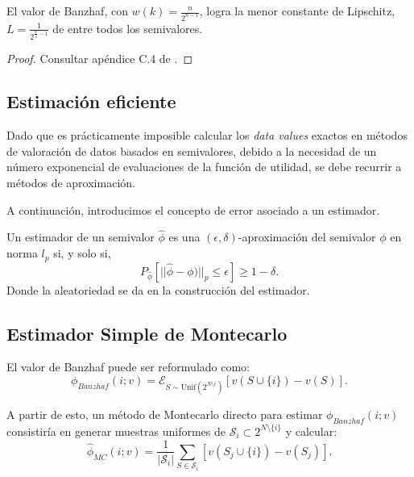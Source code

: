 \begin{theorem}
  El valor de Banzhaf, con $w(k) = \frac{n}{2^{n-1}}$, logra
  la menor constante de Lipschitz,
  $L = \frac{1}{2^{\frac{n}{2}-1}}$ de entre todos los semivalores.
\end{theorem}

\begin{proof}
  Consultar apéndice C.4 de \cite{dataBanzhaf}.
\end{proof}


\subsection{Estimación eficiente}

Dado que es prácticamente imposible calcular los
\textit{data values} exactos en métodos de valoración
de datos basados en semivalores, debido a la necesidad
de un número exponencial de evaluaciones de la función
de utilidad, se debe recurrir a métodos de aproximación.

A continuación, introducimos el concepto de error
asociado a un estimador.

\begin{definition}
  Un estimador de un semivalor $\hat{\phi}$ es
  una $(\epsilon,\delta)$-aproximación del semivalor $\phi$ 
  en norma $l_p$ si, y solo si,
  \[
  P_{\hat{\phi}}[||\hat{\phi}-\phi)||_p\leq \epsilon] \geq 1-\delta.
  \]
  Donde la aleatoriedad se da en la construcción del estimador.
\end{definition}

\subsection{Estimador Simple de Montecarlo}
El valor de Banzhaf %
puede ser reformulado como:
\begin{equation}
  \label{simpleMontecarlo}
  \phi_{Banzhaf}(i;v) = \mathcal{E}_{S \sim \text{Unif}
  (2^{N\setminus i})} [v(S \cup \{i\})-v(S)].
\end{equation}

A partir de esto, un método de Montecarlo directo
para estimar $\phi_{Banzhaf}(i;v)$ consistiría en
generar muestras uniformes de $\mathcal{S}_i
\subset 2^{N \setminus \{i\}}$ y calcular:
\begin{equation}
  \hat{\phi}_{MC}(i;v) = \frac{1}{|\mathcal{S}_i|}\sum_{S \in
  \mathcal{S}_i} [v(S_j \cup \{i\})-v(S_j)].
\end{equation}

